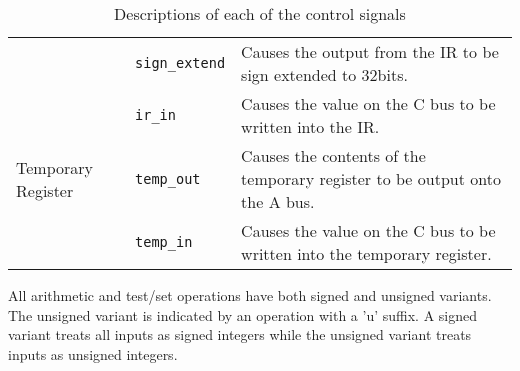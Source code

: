 \documentclass[a4paper,10pt]{article}
\begin{document}
\begin{table}[h]
\begin{center}
\begin{tabular}{|l|l|p{8cm}|}
\cline{2-3}
& \texttt{sign\_extend} & Causes the output from the IR to be sign
extended to 32bits. \\
\cline{2-3}
& \texttt{ir\_in} & Causes the value on the C bus to be written into
the IR. \\
\hline
Temporary Register & \texttt{temp\_out} & Causes the contents of the
temporary register to be output onto the A bus. \\
\cline{2-3}
& \texttt{temp\_in} & Causes the value on the C bus to be written into
the temporary register. \\
\hline
\end{tabular}
\end{center}
\caption{Descriptions of each of the control signals}
\label{table:signals}
\end{table}
\newpage
\begin{table}[h]
All arithmetic and test/set operations have both signed and unsigned
variants. The unsigned variant is indicated by an operation with a
'u' suffix. A signed variant treats all inputs as signed integers while
the unsigned variant treats inputs as unsigned integers.


\end{table}
\end{document}
